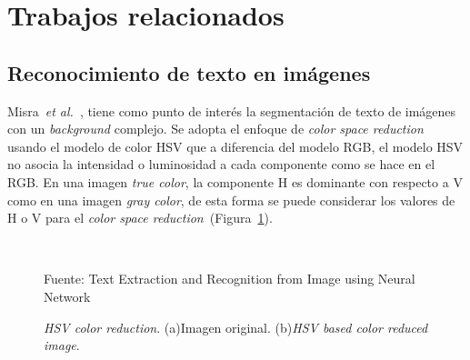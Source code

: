 \setcounter{secnumdepth}{3}
\section{Trabajos relacionados}
\subsection{Reconocimiento de texto en imágenes}

Misra~\textit{et al.}~\cite{Misra:2012:TEandR}, tiene como punto de interés la
segmentación de texto de imágenes con un \textit{background} complejo. Se adopta
el enfoque de \textit{color space reduction} usando el modelo de color HSV que a
diferencia del modelo RGB, el modelo HSV no asocia la intensidad o luminosidad a
cada componente como se hace en el RGB. En una imagen \textit{true color}, la
componente H es dominante con respecto a V como en una imagen \textit{gray
color}, de esta forma se puede considerar los valores de H o V para el
\textit{color space
reduction}~(Figura~\ref{Fig:cap-reconocimiento:HSV-colorreduction}).

\begin{figure}[h!]
	\centering
	 { }
	 \\  
	\caption[\textit{HSV color reduction}]{\textit{HSV color reduction}. (a)Imagen
original. (b)\textit{HSV based color reduced image}.}\tiny{Fuente: Text
Extraction and Recognition from Image using Neural Network
	\cite{Misra:2012:TEandR}}
	\label{Fig:cap-reconocimiento:HSV-colorreduction}
\end{figure}

